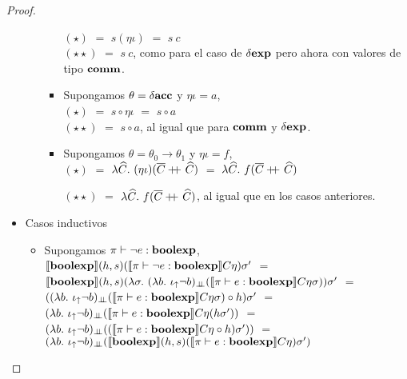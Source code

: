 \begin{proof}
\begin{itemize}
\begin{itemize}
\begin{itemize}
$(\star)$ $=$ $s(\eta\iota)$ $=$ $s \ c$\\

$(\star\star)$ $=$ $s \ c$, como para el caso de $\delta \textbf{exp}$ pero ahora con valores
de tipo $\textbf{comm}$.

\item Supongamos $\theta = \delta \textbf{acc}$ y $\eta\iota = a$,\\

$(\star)$ $=$ $s \circ \eta\iota$ $=$ $s \circ a$\\

$(\star\star)$ $=$ $s \circ a$, al igual que para $\textbf{comm}$ y $\delta \textbf{exp}$.

\item Supongamos $\theta = \theta_0 \rightarrow \theta_1$ y $\eta \iota = f$,\\

$(\star)$ $=$ $\lambda \widehat{C} . \ (\eta\iota)(\overline{C}\concat\widehat{C})$ $=$ 
$\lambda \widehat{C} . \ f(\overline{C}\concat\widehat{C})$

$(\star\star)$ $=$ $\lambda \widehat{C} . \ f(\overline{C}\concat\widehat{C})$, al igual
que en los casos anteriores.
\end{itemize}
\end{itemize}

\item Casos inductivos
\begin{itemize}
\item Supongamos $\pi \vdash \neg e : \textbf{boolexp}$,\\

$\llbracket \textbf{boolexp} \rrbracket(h,s)(\llbracket \pi \vdash \neg e : \textbf{boolexp} \rrbracket C\eta)\sigma'$ $=$\\
$\semBrcks{\boolexp}(h,s)(\lambda \sigma . \ 
 (\lambda b. \ \iotabot \neg b)_{\dbot}(\semBrcks{\pi \vdash e : \boolexp}C\eta\sigma))\sigma'$ $=$\\
$((\lambda b. \ \iota_{\uparrow} \neg b)_{\bot \!\!\! \bot}(\llbracket \pi \vdash e : \textbf{boolexp} \rrbracket C\eta\sigma) 
	\circ 
	h) \sigma'$ $=$ \\
$(\lambda b. \ \iota_{\uparrow} \neg b)_{\bot \!\!\! \bot}(\llbracket \pi \vdash e : \textbf{boolexp} \rrbracket C\eta(h\sigma'))$ $=$\\
$(\lambda b. \ \iota_{\uparrow} \neg b)_{\bot \!\!\! \bot}
	((\llbracket \pi \vdash e : \textbf{boolexp} \rrbracket C\eta \circ h)\sigma'))$ $=$\\
$(\lambda b. \ \iota_{\uparrow} \neg b)_{\bot \!\!\! \bot}
	(\llbracket \textbf{boolexp} \rrbracket(h,s)(\llbracket \pi \vdash e : \textbf{boolexp} \rrbracket C\eta)\sigma')$\\
	

\end{itemize}
\end{itemize}
\end{proof}

